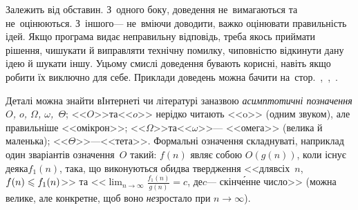 \documentclass[14pt,a4paper]{extarticle}
\begin{document}
\label{text:need-or-no-need-to-prove}
Залежить від обставин. З~одного боку, доведення не~вимагаються та не~оцінюються. З~іншого\nolinebreak[3] --- не~вміючи доводити, важко оцінювати правильність ідей. Якщо програма видає неправильну відповідь, треба якось приймати рішення, чи\nolinebreak[3] шукати й виправляти технічну помилку, чи\nolinebreak[3] повністю відкинути дану ідею й шукати іншу. У\nolinebreak[3] цьому смислі доведення бувають  корисні, навіть якщо робити їх виключно для себе. Приклади доведень можна бачити на~стор.~\pageref{text:proof-example-parket-1},~\pageref{text:proof-example-train-to-ship},~\pageref{text:proof-max-num-by-strike-out-one-digit}.



\renewcommand{\floatpagefraction}{0.625}

 Деталі можна знайти в\nolinebreak[3] Інтернеті чи літературі за\nolinebreak[1] назвою \emph{асимптотичні позначення $O$, $o$, $\Omega$, $\omega$,~$\Theta$}; <<$O$>>\nolinebreak[2] та\nolinebreak[2] <<$o$>> нерідко читають <<o>> (одним звуком), але правильніше <<омікрон>>; <<$\Omega$>>\nolinebreak[2] та\nolinebreak[2] <<$\omega$>>\nolinebreak[3] --- <<омега>> (велика й маленька); <<$\Theta$>>\nolinebreak[3] ---\nolinebreak[2] <<тета>>. Формальні означення складнуваті, наприклад один з\nolinebreak[3] варіантів означення~$O$ такий: $f(n)$ являє собою $O(g(n))$, коли існує \mbox{деяка}\nolinebreak[3] $f_1(n)$, така, що виконуються обидва твердження <<для\nolinebreak[1] всіх~$n$, $f(n)\leqslant f_1(n)$>> та <<$\displaystyle\lim_{n\to\infty}\frac{f_1(n)}{g(n)}=c$, де\nolinebreak[2] $c$\nolinebreak[3] --- скінч\'{е}нне число>> (можна велике, але конкретне, щоб воно \emph{не}\nolinebreak[3] зростало при ${n\to\infty}$).
\end{document}
